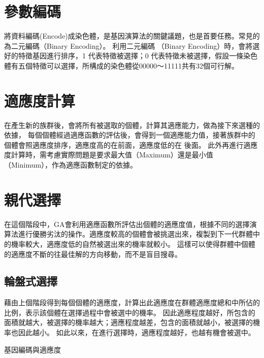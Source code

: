 \section{參數編碼}
將資料編碼(Encode)成染色體，是基因演算法的關鍵議題，也是首要任務。常見的為二元編碼（Binary Encoding）。
利用二元編碼 （Binary Encoding）時，會將選好的特徵基因進行排序，1 代表特徵被選擇；0 代表特徵未被選擇，假設一條染色體有五個特徵可以選擇，所構成的染色體從00000～11111共有32個可行解。

\section{適應度計算}


在產生新的族群後，會將所有被選取的個體，計算其適應能力，做為接下來選種的依據， 每個個體經過適應函數的評估後，會得到一個適應能力值，接著族群中的個體會照適應度排序，適應度高的在前面，適應度低的在 後面。
此外再進行適應度計算時，需考慮實際問題是要求最大值（Maximum）還是最小值（Minimum），作為適應函數制定的依據。

\section{親代選擇}
在這個階段中，GA會利用適應函數所評估出個體的適應度值，根據不同的選擇演算法進行優勝劣汰的操作。適應度較高的個體會被挑選出來，複製到下一代群體中的機率較大，適應度低的自然被選出來的機率就較小。 這樣可以使得群體中個體的適應度不斷的往最佳解的方向移動，而不是盲目搜尋。

\subsection{輪盤式選擇}

藉由上個階段得到每個個體的適應度，計算出此適應度在群體適應度總和中所佔的比例，表示該個體在選擇過程中會被選中的機率。
因此適應程度越好，所包含的面積就越大，被選擇的機率越大；適應程度越差，包含的面積就越小，被選擇的機率也因此越小。
如此以來，在進行選擇時，適應程度越好，也越有機會被選中。

\begin{table}[h!]
	\centering
	\label{tab:GeneEncodeAndFitness}
	
	\caption{基因編碼與適應度}
\end{table}


